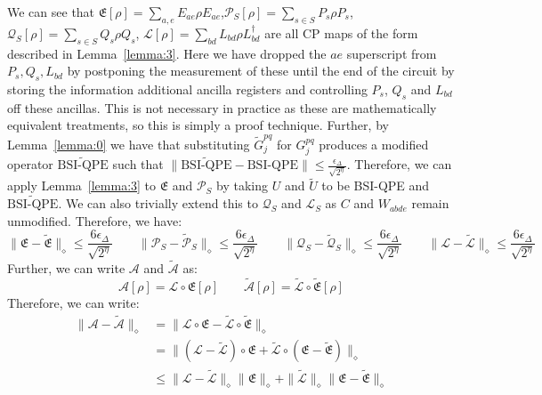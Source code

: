 \documentclass[aps,floatfix,10pt,amssymb,amsfont,amsmath,superscriptaddress,float,nofootinbib,longbibliography,nobalancelastpage,twocolumn]{revtex4-2}
\begin{document}
\begin{widetext}
We can see that $\mathfrak{E}[\rho] = \sum_{a,e} E_{ae} \rho E_{ae}$,$\mathcal{P}_S[\rho] = \sum_{s\in S} P_s \rho P_s$, $\mathcal{Q}_S[\rho] = \sum_{s\in S} Q_s \rho Q_s$, $\mathcal{L}[\rho] = \sum_{bd} L_{bd} \rho L^{\dagger}_{bd}$ are all CP maps of the form described in Lemma~\ref{lemma:3}. Here we have dropped the $ae$ superscript from $P_s, Q_s, L_{bd}$ by postponing the measurement of these until the end of the circuit by storing the information additional ancilla registers and controlling $P_s$, $Q_s$ and $L_{bd}$ off these ancillas. This is not necessary in practice as these are mathematically equivalent treatments, so this is simply a proof technique. Further, by Lemma~\ref{lemma:0} we have that substituting $\tilde G^{pq}_j$ for $G^{pq}_j$ produces a modified operator $\widetilde{\text{BSI-QPE}}$ such that $\|\widetilde{\text{BSI-QPE}}- \text{BSI-QPE}\| \leq \frac{\epsilon_{\Delta}}{\sqrt{2^{\eta}}}$. Therefore, we can apply Lemma~\ref{lemma:3} to $\mathfrak{E}$ and $\mathcal{P}_S$ by taking $U$ and $\tilde U$ to be BSI-QPE and $\widetilde{\text{BSI-QPE}}$. We can also trivially extend this to $\mathcal{Q}_S$ and $\mathcal{L}_S$ as $C$ and $W_{abde}$ remain unmodified. Therefore, we have:
\begin{equation}
    \|\mathfrak{E} - \tilde{\mathfrak{E}}\|_{\diamond} \leq \frac{6\epsilon_{\Delta}}{\sqrt{2^{\eta}}} \qquad\|\mathcal{P}_S - \tilde{\mathcal{P}}_S\|_{\diamond} \leq \frac{6\epsilon_{\Delta}}{\sqrt{2^{\eta}}} \qquad\|\mathcal{Q}_S - \tilde{\mathcal{Q}}_S\|_{\diamond} \leq \frac{6\epsilon_{\Delta}}{\sqrt{2^{\eta}}}  \qquad\|\mathcal{L} - \tilde{\mathcal{L}}\|_{\diamond} \leq \frac{6\epsilon_{\Delta}}{\sqrt{2^{\eta}}} 
\end{equation}
Further, we can write $\mathcal{A}$ and $\tilde{\mathcal{A}}$ as:
\begin{equation}
    \mathcal{A}[\rho] = \mathcal{L} \circ \mathfrak{E} [\rho] \qquad  \tilde{\mathcal{A}}[\rho] = \tilde{\mathcal{L}} \circ \tilde{\mathfrak{E}} [\rho]
\end{equation}
Therefore, we can write:
\begin{align}
    \|\mathcal{A} - \tilde{\mathcal{A}}\|_{\diamond} &= \|\mathcal{L} \circ \mathfrak{E} - \tilde{\mathcal{L}} \circ \tilde{\mathfrak{E}}\|_{\diamond}\\
    &=\|(\mathcal{L}-\tilde{\mathcal{L}}) \circ \mathfrak{E} + \tilde{\mathcal{L}} \circ (\mathfrak{E}-\tilde{\mathfrak{E}})\|_{\diamond}\\
    &\leq\|\mathcal{L}-\tilde{\mathcal{L}}\|_{\diamond} \|\mathfrak{E} \|_{\diamond}+ \|\tilde{\mathcal{L}}\|_{\diamond} \|\mathfrak{E}-\tilde{\mathfrak{E}}\|_{\diamond}\\

\end{align}
\end{widetext}
\end{document}
